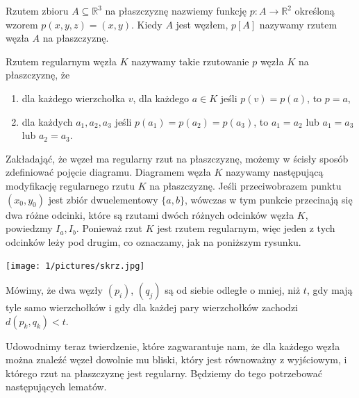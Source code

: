\begin{definicja}
 Rzutem zbioru $A\subseteq\mathbb{R}^3$ na płaszczyznę nazwiemy funkcję $p\colon A\to\mathbb{R}^2$ określoną wzorem $p(x,y,z) = (x,y)$. Kiedy $A$ jest węzłem, $p[A]$ nazywamy 
 rzutem węzła $A$ na płaszczyznę.
\end{definicja}


\begin{definicja}
\label{rzut_reg}
 Rzutem regularnym węzła $K$ nazywamy takie rzutowanie $p$ węzła $K$ na płaszczyznę, że
 \begin{enumerate}
  \item dla każdego wierzchołka $v$, dla każdego $a\in K$ jeśli $p(v) = p(a)$, to $p=a$,
  \item dla każdych $a_1, a_2, a_3$ jeśli $p(a_1)=p(a_2)=p(a_3)$, to $a_1=a_2$ lub $a_1=a_3$ lub $a_2=a_3$.
 \end{enumerate}
\end{definicja}

Zakładająć, że węzeł ma regularny rzut na płaszczyznę, możemy w ścisły sposób zdefiniować pojęcie diagramu.
Diagramem węzła $K$ nazywamy następującą modyfikację regularnego rzutu $K$ na płaszczyznę. Jeśli przeciwobrazem punktu $(x_0, y_0)$ jest zbiór dwuelementowy 
$\lbrace a,b\rbrace$, wówczas w tym punkcie przecinają się dwa różne odcinki, które są rzutami dwóch różnych odcinków węzła $K$, powiedzmy $I_a, I_b$. 
Ponieważ rzut $K$ jest rzutem regularnym, więc jeden z tych odcinków leży pod drugim, co oznaczamy, jak na poniższym rysunku. \\


	\begin{center}

	\texttt{[image: 1/pictures/skrz.jpg]}
	\end{center}


\begin{definicja}
 Mówimy, że dwa węzły $(p_i)$, $(q_j)$ są od siebie odległe o mniej, niż $t$, gdy mają tyle samo wierzchołków i gdy dla każdej pary wierzchołków zachodzi $d(p_k,q_k) < t$.
\end{definicja}

Udowodnimy teraz twierdzenie, które zagwarantuje nam, że dla każdego węzła można znaleźć węzeł dowolnie mu bliski, który jest równoważny z wyjściowym, i którego rzut na płaszczyznę jest regularny. 
Będziemy do tego potrzebować następujących lematów.

